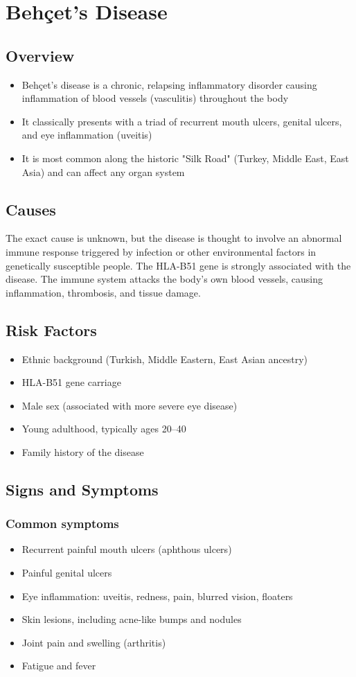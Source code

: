 \chapter{Behçet's Disease}
\label{sec:Behçet's Disease}

\section{Overview}
\begin{itemize}[noitemsep]
  \item Behçet's disease is a chronic, relapsing inflammatory disorder causing inflammation of blood vessels (vasculitis) throughout the body
  \item It classically presents with a triad of recurrent mouth ulcers, genital ulcers, and eye inflammation (uveitis)
  \item It is most common along the historic "Silk Road" (Turkey, Middle East, East Asia) and can affect any organ system
\end{itemize}
\section{Causes}
The exact cause is unknown, but the disease is thought to involve an abnormal immune response triggered by infection or other environmental factors in genetically susceptible people. The HLA-B51 gene is strongly associated with the disease. The immune system attacks the body's own blood vessels, causing inflammation, thrombosis, and tissue damage.
\section{Risk Factors}
\begin{itemize}[noitemsep]
  \item Ethnic background (Turkish, Middle Eastern, East Asian ancestry)
  \item HLA-B51 gene carriage
  \item Male sex (associated with more severe eye disease)
  \item Young adulthood, typically ages 20--40
  \item Family history of the disease
\end{itemize}
\section{Signs and Symptoms}
\subsection{Common symptoms}
\begin{itemize}[noitemsep]
  \item Recurrent painful mouth ulcers (aphthous ulcers)
  \item Painful genital ulcers
  \item Eye inflammation: uveitis, redness, pain, blurred vision, floaters
  \item Skin lesions, including acne-like bumps and nodules
  \item Joint pain and swelling (arthritis)
  \item Fatigue and fever
\end{itemize}
